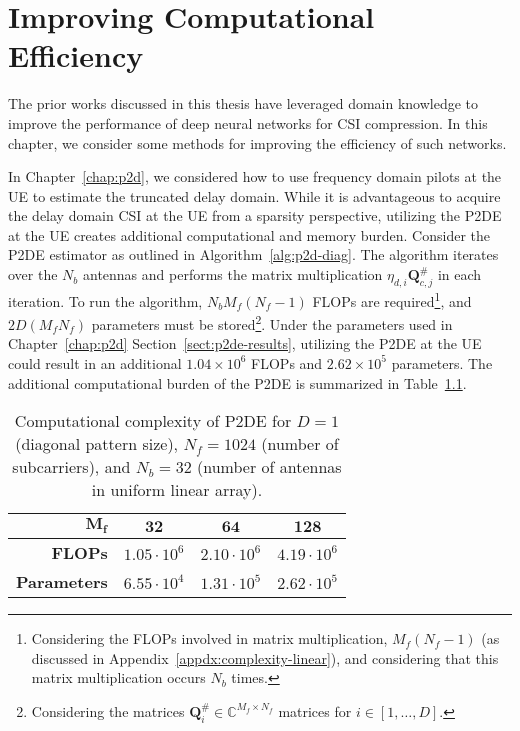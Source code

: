 \chapter{Improving Computational Efficiency} \label{chap:comp-effic}

The prior works discussed in this thesis have leveraged domain knowledge to improve the performance of deep neural networks for CSI compression. In this chapter, we consider some methods for improving the efficiency of such networks.

In Chapter~\ref{chap:p2d}, we considered how to use frequency domain pilots at the UE to estimate the truncated delay domain. While it is advantageous to acquire the delay domain CSI at the UE from a sparsity perspective, utilizing the P2DE at the UE creates additional computational and memory burden. Consider the P2DE estimator as outlined in Algorithm~\ref{alg:p2d-diag}. The algorithm iterates over the $N_b$ antennas and performs the matrix multiplication $\eta_{d,i}\mathbf{Q}_{c,j}^{\#}$ in each iteration. To run the algorithm, $N_bM_f(N_f-1)$ FLOPs are required\footnote{Considering the FLOPs involved in matrix multiplication, $M_f(N_f-1)$ (as discussed in Appendix~\ref{appdx:complexity-linear}), and considering that this matrix multiplication occurs $N_b$ times.}, and $2D(M_fN_f)$ parameters must be stored\footnote{Considering the matrices $\mathbf{Q}_i^{\#} \in \mathbb{C}^{M_f \times N_f}$ matrices for $i \in [1, \dots, D]$.}. Under the parameters used in Chapter~\ref{chap:p2d} Section~\ref{sect:p2de-results}, utilizing the P2DE at the UE could result in an additional $1.04\times 10^{6}$ FLOPs and $2.62\times 10^{5}$ parameters. The additional computational burden of the P2DE is summarized in Table~\ref{tab:p2de-comp}. %

\begin{table}[!h]
\caption{Computational complexity of P2DE for $D=1$ (diagonal pattern size), $N_f=1024$ (number of subcarriers), and $N_b=32$ (number of antennas in uniform linear array).}
\begin{center}
\label{tab:p2de-comp} 
\begin{tabular}{|r|c|c|c|}
\hline
$\mathbf{M_f}$      & $\mathbf{32}$      & $\mathbf{64}$       & $\mathbf{128}$     \\ \hline
\textbf{FLOPs}      & $1.05\cdot 10^{6}$ & $2.10\cdot 10^{6}$  & $4.19\cdot 10^{6}$ \\ \hline
\textbf{Parameters} & $6.55\cdot 10^{4}$ & $1.31\cdot 10^{5}$  & $2.62\cdot 10^{5}$  \\ \hline
\end{tabular}
\end{center}
\vspace*{-0.3mm}
\end{table}

